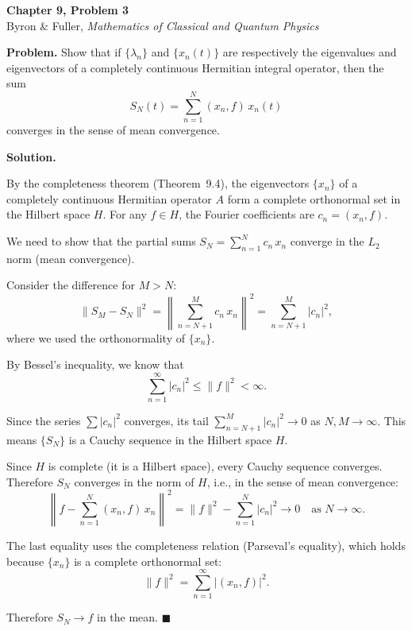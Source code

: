 \documentclass[12pt]{article}
\begin{document}
\begin{center}
{\Large\bfseries Chapter 9, Problem 3}\\[6pt]
Byron \& Fuller, \textit{Mathematics of Classical and Quantum Physics}
\end{center}

\bigskip

\textbf{Problem.} Show that if $\{\lambda_n\}$ and $\{x_n(t)\}$ are respectively the eigenvalues and eigenvectors of a completely continuous Hermitian integral operator, then the sum
\[
S_N(t) = \sum_{n=1}^{N} (x_n, f)\,x_n(t)
\]
converges in the sense of mean convergence.

\bigskip
\textbf{Solution.}

By the completeness theorem (Theorem~9.4), the eigenvectors $\{x_n\}$ of a completely continuous Hermitian operator $A$ form a complete orthonormal set in the Hilbert space $H$. For any $f \in H$, the Fourier coefficients are $c_n = (x_n, f)$.

We need to show that the partial sums $S_N = \sum_{n=1}^{N} c_n\,x_n$ converge in the $L_2$ norm (mean convergence).

Consider the difference for $M > N$:
\[
\|S_M - S_N\|^2 = \left\|\sum_{n=N+1}^{M} c_n\,x_n\right\|^2 = \sum_{n=N+1}^{M} |c_n|^2,
\]
where we used the orthonormality of $\{x_n\}$.

By Bessel's inequality, we know that
\[
\sum_{n=1}^{\infty} |c_n|^2 \le \|f\|^2 < \infty.
\]

Since the series $\sum |c_n|^2$ converges, its tail $\sum_{n=N+1}^{M} |c_n|^2 \to 0$ as $N, M \to \infty$. This means $\{S_N\}$ is a Cauchy sequence in the Hilbert space $H$.

Since $H$ is complete (it is a Hilbert space), every Cauchy sequence converges. Therefore $S_N$ converges in the norm of $H$, i.e., in the sense of mean convergence:
\[
\left\|f - \sum_{n=1}^{N} (x_n, f)\,x_n\right\|^2 = \|f\|^2 - \sum_{n=1}^{N} |c_n|^2 \to 0 \quad \text{as } N \to \infty.
\]

The last equality uses the completeness relation (Parseval's equality), which holds because $\{x_n\}$ is a complete orthonormal set:
\[
\|f\|^2 = \sum_{n=1}^{\infty} |(x_n, f)|^2.
\]

Therefore $S_N \to f$ in the mean. \hfill $\blacksquare$
\end{document}
